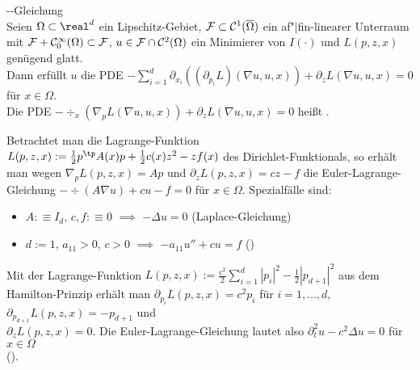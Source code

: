 \begin{Satz}{--Gleichung}\\
    Seien $\Omega \subset \real^d$ ein Lipschitz-Gebiet,
    $\mathcal{F} \subset \mathcal{C}^1(\overline{\Omega})$ ein af"|fin-linearer Unterraum mit
    $\mathcal{F} + \mathcal{C}_0^\infty(\Omega) \subset \mathcal{F}$,
    $u \in \mathcal{F} \cap \mathcal{C}^2(\Omega)$ ein Minimierer von $I(\cdot)$ und
    $L(p, z, x)$ genügend glatt.\\
    Dann erfüllt $u$ die PDE
    $-\sum_{i=1}^d \partial_{x_i} ((\partial_{p_i} L) (\nabla u, u, x)) +
    \partial_z L(\nabla u, u, x) = 0$
    für $x \in \Omega$.\\
    Die PDE $-\div_x(\nabla_p L(\nabla u, u, x)) + \partial_z L(\nabla u, u, x) = 0$ heißt .
\end{Satz}

\linie

\begin{Bsp}
    Betrachtet man die Lagrange-Funktion
    $L(p, z, x) := \frac{1}{2} p^\tp A(x) p + \frac{1}{2} c(x) z^2 - zf(x)$
    des Dirichlet-Funktionals, so erhält man wegen $\nabla_p L(p, z, x) = Ap$ und
    $\partial_z L(p, z, x) = cz - f$ die Euler-Lagrange-Gleichung
    $-\div(A\nabla u) + cu - f = 0$ für $x \in \Omega$.
    Spezialfälle sind:
    \begin{itemize}
        \item
        $A :\equiv I_d$, $c, f :\equiv 0$
        $\implies$ $-\Delta u = 0$ (Laplace-Gleichung)

        \item
        $d := 1$, $a_{11} > 0$, $c > 0$
        $\implies$ $-a_{11} u'' + cu = f$ ()
    \end{itemize}
\end{Bsp}

\linie

\begin{Bsp}
    Mit der Lagrange-Funktion
    $L(p, z, x) := \frac{c^2}{2} \sum_{i=1}^d |p_i|^2 - \frac{1}{2} |p_{d+1}|^2$ aus dem
    Hamilton-Prinzip erhält man $\partial_{p_i} L(p, z, x) = c^2 p_i$ für $i = 1, \dotsc, d$,
    $\partial_{p_{d+1}} L(p, z, x) = -p_{d+1}$ und\\
    $\partial_z L(p, z, x) = 0$.
    Die Euler-Lagrange-Gleichung lautet also
    $\partial_t^2 u - c^2 \Delta u = 0$ für $x \in \Omega$\\
    ().
\end{Bsp}


